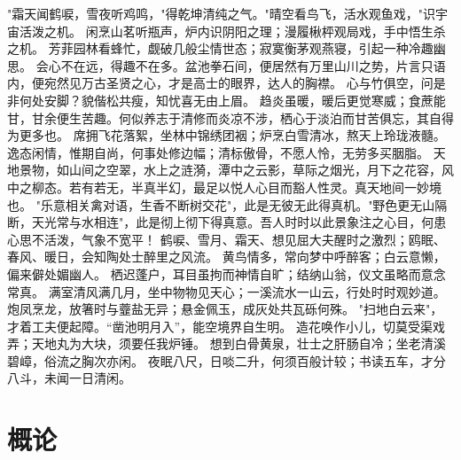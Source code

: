\documentclass[12pt,UTF8]{ctexbook}
\begin{document}
"霜天闻鹤唳，雪夜听鸡鸣，"得乾坤清纯之气。"晴空看鸟飞，活水观鱼戏，"识宇宙活泼之机。
闲烹山茗听瓶声，炉内识阴阳之理；漫履楸枰观局戏，手中悟生杀之机。
芳菲园林看蜂忙，觑破几般尘情世态；寂寞衡茅观燕寝，引起一种冷趣幽思。
会心不在远，得趣不在多。盆池拳石间，便居然有万里山川之势，片言只语内，便宛然见万古圣贤之心，才是高士的眼界，达人的胸襟。
心与竹俱空，问是非何处安脚？貌偕松共瘦，知忧喜无由上眉。
趋炎虽暖，暖后更觉寒威；食蔗能甘，甘余便生苦趣。何似养志于清修而炎凉不涉，栖心于淡泊而甘苦俱忘，其自得为更多也。
席拥飞花落絮，坐林中锦绣团裀；炉烹白雪清冰，熬天上玲珑液髓。
逸态闲情，惟期自尚，何事处修边幅；清标傲骨，不愿人怜，无劳多买胭脂。
天地景物，如山间之空翠，水上之涟漪，潭中之云影，草际之烟光，月下之花容，风中之柳态。若有若无，半真半幻，最足以悦人心目而豁人性灵。真天地间一妙境也。
"乐意相关禽对语，生香不断树交花"，此是无彼无此得真机。"野色更无山隔断，天光常与水相连"，此是彻上彻下得真意。吾人时时以此景象注之心目，何患心思不活泼，气象不宽平！
鹤唳、雪月、霜天、想见屈大夫醒时之激烈；鸥眠、春风、暖日，会知陶处士醉里之风流。
黄鸟情多，常向梦中呼醉客；白云意懒，偏来僻处媚幽人。
栖迟蓬户，耳目虽拘而神情自旷；结纳山翁，仪文虽略而意念常真。
满室清风满几月，坐中物物见天心；一溪流水一山云，行处时时观妙道。
炮凤烹龙，放箸时与虀盐无异；悬金佩玉，成灰处共瓦砾何殊。
"扫地白云来"，才着工夫便起障。“凿池明月入”，能空境界自生明。
造花唤作小儿，切莫受渠戏弄；天地丸为大块，须要任我炉锤。
想到白骨黄泉，壮士之肝肠自冷；坐老清溪碧嶂，俗流之胸次亦闲。
夜眠八尺，日啖二升，何须百般计较；书读五车，才分八斗，未闻一日清闲。

\chapter{概论}
\end{document}
